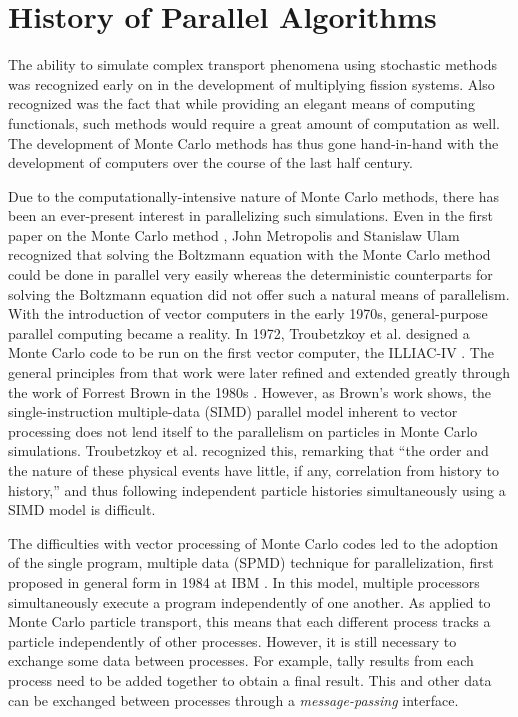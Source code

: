 \section{History of Parallel Algorithms}

The ability to simulate complex transport phenomena using stochastic methods was
recognized early on in the development of multiplying fission systems. Also
recognized was the fact that while providing an elegant means of computing
functionals, such methods would require a great amount of computation as
well. The development of Monte Carlo methods has thus gone hand-in-hand with the
development of computers over the course of the last half century.

Due to the computationally-intensive nature of Monte Carlo methods, there has
been an ever-present interest in parallelizing such simulations. Even in the
first paper on the Monte Carlo method \cite{jama-metropolis-1949}, John
Metropolis and Stanislaw Ulam recognized that solving the Boltzmann equation
with the Monte Carlo method could be done in parallel very easily whereas the
deterministic counterparts for solving the Boltzmann equation did not offer such
a natural means of parallelism. With the introduction of vector computers in the
early 1970s, general-purpose parallel computing became a reality. In 1972,
Troubetzkoy et al. designed a Monte Carlo code to be run on the first vector
computer, the ILLIAC-IV \cite{trans-troubetzkoy-1973}. The general principles
from that work were later refined and extended greatly through the work of
Forrest Brown in the 1980s \cite{pne-brown-1984}. However, as Brown's work
shows, the single-instruction multiple-data (SIMD) parallel model inherent to
vector processing does not lend itself to the parallelism on particles in Monte
Carlo simulations. Troubetzkoy et al. recognized this, remarking that ``the
order and the nature of these physical events have little, if any, correlation
from history to history,'' and thus following independent particle histories
simultaneously using a SIMD model is difficult.

The difficulties with vector processing of Monte Carlo codes led to the adoption
of the single program, multiple data (SPMD) technique for parallelization, first
proposed in general form in 1984 at IBM \cite{pvmmpi-darema-2001}. In this
model, multiple processors simultaneously execute a program independently of one
another. As applied to Monte Carlo particle transport, this means that each
different process tracks a particle independently of other processes. However,
it is still necessary to exchange some data between processes. For example,
tally results from each process need to be added together to obtain a final
result. This and other data can be exchanged between processes through a
\emph{message-passing} interface.

